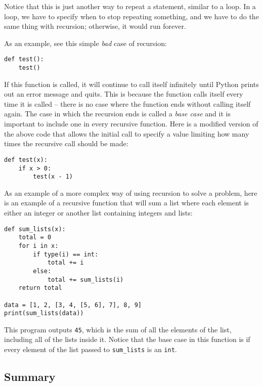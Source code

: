 \documentclass[11pt]{cselabheader}
\begin{document}
Notice that this is just another way to repeat a statement, similar to a loop.
In a loop, we have to specify when to stop repeating something, and we have to
do the same thing with recursion; otherwise, it would run forever.

As an example, see this simple \emph{bad} case of recursion:

\begin{lstlisting}[style=python]
def test():
    test()
\end{lstlisting}

If this function is called, it will continue to call itself infinitely until
Python prints out an error message and quits. This is because the function calls
itself every time it is called -- there is no case where the function ends
without calling itself again. The case in which the recursion ends is called a
\emph{base case} and it is important to include one in every recursive function.
Here is a modified version of the above code that allows the initial call to
specify a value limiting how many times the recursive call should be made:

\begin{lstlisting}[style=python]
def test(x):
    if x > 0:
        test(x - 1)
\end{lstlisting}

As an example of a more complex way of using recursion to solve a problem, here
is an example of a recursive function that will sum a list where each element is
either an integer or another list containing integers and lists:

\begin{lstlisting}[style=python]
def sum_lists(x):
    total = 0
    for i in x:
        if type(i) == int:
            total += i
        else:
            total += sum_lists(i)
    return total

data = [1, 2, [3, 4, [5, 6], 7], 8, 9]
print(sum_lists(data))
\end{lstlisting}

This program outputs \lstinline{45}, which is the sum of all the elements of the
list, including all of the lists inside it. Notice that the base case in this
function is if every element of the list passed to \lstinline{sum_lists} is an
\lstinline{int}.

\pagebreak
\subsection{Summary}
\end{document}
